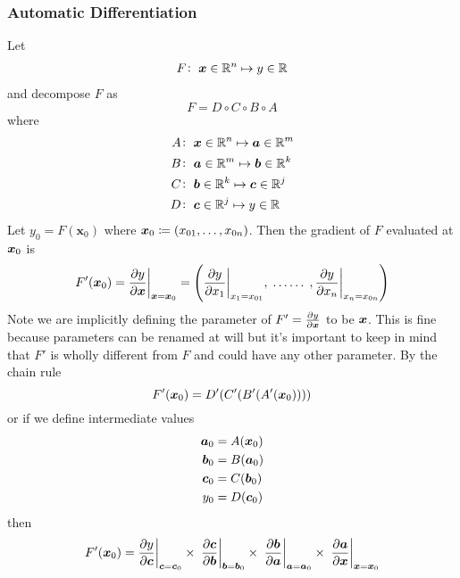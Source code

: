 \subsubsection{Automatic Differentiation}
Let
%
\begin{align*}
    F\colon\; \bm{x} \in \mathbb{R}^n \mapsto y \in \mathbb{R}
\end{align*}
%
and decompose \(F\) as
\begin{equation*}
    F = D \circ C \circ B \circ A
\end{equation*}
%
where
%
\begin{align*}
    A & \colon\; \bm{x} \in \mathbb{R}^n \mapsto  \bm{a} \in \mathbb{R}^m    \\
    B & \colon\; \bm{a} \in \mathbb{R}^m \mapsto  \bm{b} \in \mathbb{R}^k \\
    C & \colon\; \bm{b} \in \mathbb{R}^k \mapsto  \bm{c} \in \mathbb{R}^j \\
    D & \colon\; \bm{c} \in \mathbb{R}^j \mapsto  y \in \mathbb{R}
\end{align*}
%
Let \(y_0 = F(\bm{x}_0)\) where \(\bm{x}_0 \coloneqq \left( x_{01}, \dots, x_{0n}\right)\).
%
Then the gradient of \(F\) evaluated at \(\bm{x}_0\) is
\begin{equation*}
    F'(\bm{x}_0) = \evalat[\bigg]{\pdv{y}{\bm{x}}}{\bx = \bx_0}
    = \left(
    \evalat[\bigg]{\pdv{y}{x_1}}{x_1 = x_{01}},
    \;\dots\dots\;,
    \evalat[\bigg]{\pdv{y}{x_n}}{x_n = x_{0n}}
    \right)
\end{equation*}
%
Note we are implicitly defining the parameter of \(F' = \pdv{y}{\bm{x}}\) to be \(\bm{x}\).
%
This is fine because parameters can be renamed at will but it's important to keep in mind that \(F'\) is wholly different from \(F\) and could have any other parameter.
%
By the chain rule
\begin{equation*}
    F'(\bm{x}_0) =  D'(C'(B'(A'(\bm{x}_0))))
\end{equation*}
%
or if we define intermediate values
%
\begin{align*}
    \bm{a}_0 & = A(\bm{x}_0)    \\
    \bm{b}_0 & = B(\bm{a}_0) \\
    \bm{c}_0 & = C(\bm{b}_0) \\
    y_0      & = D(\bm{c}_0)
\end{align*}
%
then
%
\begin{equation}
    F'(\bm{x}_0) =  \evalat[\bigg]{\pdv{y}{\bm{c}}}{\bm{c}=\bm{c}_0} \times\;
    \evalat[\bigg]{\pdv{\bm{c}}{\bm{b}}}{\bm{b}=\bm{b}_0} \times\;
    \evalat[\bigg]{\pdv{\bm{b}}{\bm{a}}}{\bm{a}=\bm{a}_0} \times\;
    \evalat[\bigg]{\pdv{\bm{a}}{\bm{x}}}{\bx=\bx_0} \label{eqn:chainruleproduct}
\end{equation}

